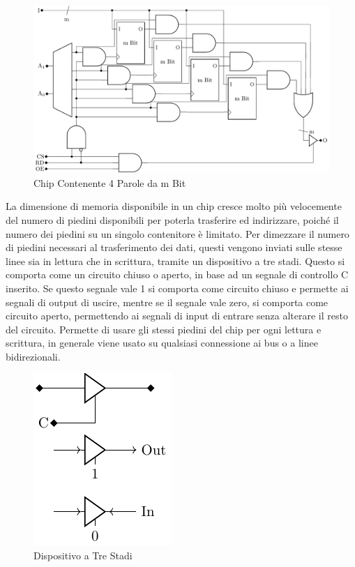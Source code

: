 \documentclass{article}
\numberwithin{equation}{subsection}
\begin{document}
\begin{figure}[H]%
    \centering%
    \includegraphics[scale=0.8]{chip-memoria.pdf}%
    \caption{Chip Contenente 4 Parole da m Bit}%
\end{figure}

La dimensione di memoria disponibile in un chip cresce molto più velocemente del numero di piedini disponibili per poterla trasferire ed indirizzare, poiché il numero dei piedini su un singolo contenitore è 
limitato. 
Per dimezzare il numero di piedini necessari al trasferimento dei dati, questi vengono inviati sulle stesse linee sia in lettura che in scrittura, tramite un dispositivo a tre stadi. Questo si comporta come un 
circuito chiuso o aperto, in base ad un segnale di controllo C inserito. Se questo segnale vale 1 si comporta come circuito chiuso e permette ai segnali di output di uscire, mentre se il segnale vale zero, si 
comporta come circuito aperto, permettendo ai segnali di input di entrare senza alterare il resto del circuito. Permette di usare gli stessi piedini del chip per ogni lettura e scrittura, in generale viene usato su 
qualsiasi connessione ai bus o a linee bidirezionali. 

\begin{figure}[H]%
    \centering%
    \includegraphics[scale=0.9]{dispositivo-3-stadi.pdf}%
    \caption{Dispositivo a Tre Stadi}%
\end{figure}
\end{document}
